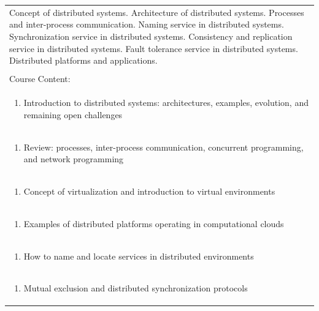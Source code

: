 \documentclass[11pt]{article}
\begin{document}
\begin{center}
\begin{longtable}{|p{4cm}|p{4cm}|p{4cm}|p{4cm}|}
\multicolumn{4}{|p{\dimexpr 16cm + 6\tabcolsep\relax}|}{Concept of distributed systems. Architecture of distributed systems. Processes and inter-process communication. Naming service in distributed systems. Synchronization service in distributed systems. Consistency and replication service in distributed systems. Fault tolerance service in distributed systems. Distributed platforms and applications.}\\
\multicolumn{4}{|p{16cm}|}{}\\
\hline
\multicolumn{4}{|p{16cm}|}{Course Content:}\\*
\multicolumn{4}{|p{\dimexpr 16cm + 6\tabcolsep\relax}|}{\begin{enumerate}[start=1]\item Introduction to distributed systems: architectures, examples, evolution, and remaining open challenges\end{enumerate}}\\
\multicolumn{4}{|p{\dimexpr 16cm + 6\tabcolsep\relax}|}{\begin{enumerate}[start=2]\item Review: processes, inter-process communication, concurrent programming, and network programming\end{enumerate}}\\
\multicolumn{4}{|p{\dimexpr 16cm + 6\tabcolsep\relax}|}{\begin{enumerate}[start=3]\item Concept of virtualization and introduction to virtual environments\end{enumerate}}\\
\multicolumn{4}{|p{\dimexpr 16cm + 6\tabcolsep\relax}|}{\begin{enumerate}[start=4]\item Examples of distributed platforms operating in computational clouds\end{enumerate}}\\
\multicolumn{4}{|p{\dimexpr 16cm + 6\tabcolsep\relax}|}{\begin{enumerate}[start=5]\item How to name and locate services in distributed environments\end{enumerate}}\\
\multicolumn{4}{|p{\dimexpr 16cm + 6\tabcolsep\relax}|}{\begin{enumerate}[start=6]\item Mutual exclusion and distributed synchronization protocols\end{enumerate}}\\

\end{longtable}
\end{center}
\end{document}
